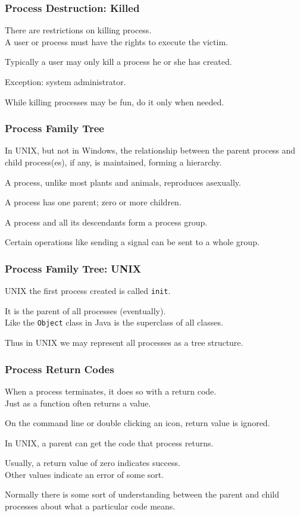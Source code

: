 \begin{frame}
	\frametitle{Process Destruction: Killed}

	There are restrictions on killing process.\\
	\quad A user or process must have the rights to execute the victim.

	Typically a user may only kill a process he or she has created.

	Exception: system administrator.

	While killing processes may be fun, do it only when needed.


\end{frame}


\begin{frame}
	\frametitle{Process Family Tree}
	In UNIX, but not in Windows, the relationship between the parent process and child process(es), if any, is maintained, forming a hierarchy.

	A process, unlike most plants and animals, reproduces asexually.

	A process has one parent; zero or more children.

	A process and all its descendants form a \alert{process group}.

	Certain operations like sending a signal can be sent to a whole group.

\end{frame}

\begin{frame}
	\frametitle{Process Family Tree: UNIX}
	UNIX the first process created is called \texttt{init}.

	It is the parent of all processes (eventually).\\
	\quad Like the \texttt{Object} class in Java is the superclass of all classes.

	Thus in UNIX we may represent all processes as a tree structure.

\end{frame}

\begin{frame}
	\frametitle{Process Return Codes}

	When a process terminates, it does so with a return code.\\
	\quad  Just as a function often returns a value.

	On the command line or double clicking an icon, return value is ignored.

	In UNIX, a parent can get the code that process returns.

	Usually, a return value of zero indicates success.\\
	\quad Other values indicate an error of some sort.

	Normally there is some sort of understanding between the parent and child processes about what a particular code means.

\end{frame}


